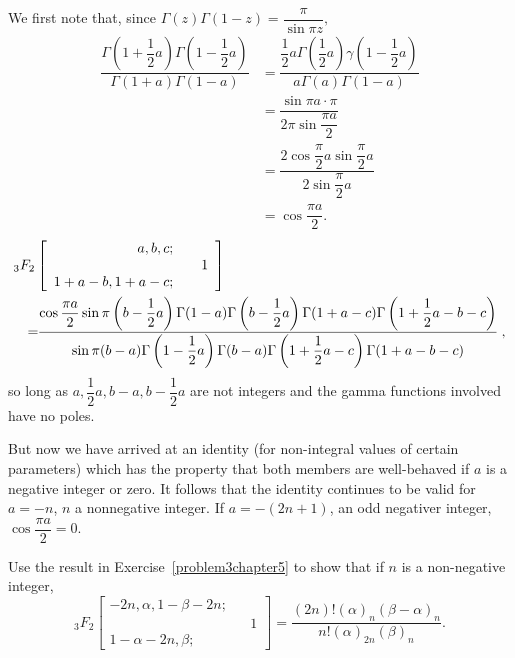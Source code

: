 \begin{solution}
We first note that, since $\Gamma(z)\Gamma(1-z) = \dfrac{\pi}{\sin \pi z},$
$$\begin{array}{ll}
\dfrac{\Gamma \left( 1 + \dfrac{1}{2}a \right) \Gamma \left( 1 - \dfrac{1}{2}a \right)}{\Gamma \left( 1+a \right) \Gamma(1-a)} &= \dfrac{\dfrac{1}{2}a \Gamma \left( \dfrac{1}{2} a \right) \gamma \left( 1 - \dfrac{1}{2}a \right)}{a \Gamma(a) \Gamma(1-a)} \\
&= \dfrac{\sin \pi a \cdot \pi}{2 \pi \sin \dfrac{\pi a}{2}} \\
&= \dfrac{2 \cos \dfrac{\pi}{2}a \sin \dfrac{\pi}{2}a}{2 \sin \dfrac{\pi}{2}a} \\
&= \cos \dfrac{\pi a}{2}.
\end{array}$$
\begin{eqnarray*}
\lefteqn{{}_3F_2 \left[ \begin{array}{rlr}
a,b,c; & & \\
& & 1 \\
1+a-b, 1+a-c; & &
\end{array} \right]} \\
& & =\!\!\dfrac{\cos \dfrac{\pi a}{2} \sin \pi \left(b- \dfrac{1}{2}a \right)\Gamma(1-a) \Gamma \left( b- \dfrac{1}{2}a \right) \Gamma(1+a-c) \Gamma \left( 1 + \dfrac{1}{2}a - b - c \right)}{\sin \pi (b-a)\Gamma \left( 1 - \dfrac{1}{2}a \right) \Gamma(b-a) \Gamma \left(1 + \dfrac{1}{2}a - c \right) \Gamma(1+a-b-c)}\dfrac{}{},
\end{eqnarray*}
so long as $a, \dfrac{1}{2}a, b-a, b-\dfrac{1}{2}a$ are not integers and the gamma functions involved have no poles.

But now we have arrived at an identity (for non-integral values of certain parameters) which has the property that both members are well-behaved if $a$ is a negative integer or zero. It follows that the identity continues to be valid for $a = -n$, $n$ a nonnegative integer. 
If $a = -(2n+1)$, an odd negativer integer, $\cos \dfrac{\pi a}{2}=0$.
\end{solution}
\begin{problem}\label{problem4chapter5}
Use the result in Exercise~\ref{problem3chapter5} to show that if $n$ is a non-negative integer,
$$_3F_2\left[ \begin{array}{rlr}
-2n,\alpha,1- \beta - 2n; & & \\
& & 1 \\
1- \alpha - 2n, \beta; & &
\end{array} \right] = \dfrac{(2n)!(\alpha)_n (\beta - \alpha)_n}{n! (\alpha)_{2n}(\beta)_n}.$$
\end{problem}
